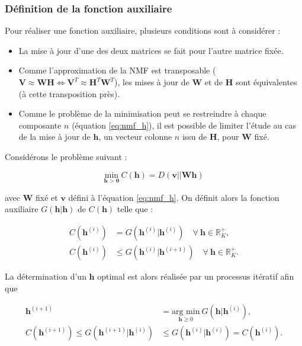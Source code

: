 \subsubsection{Définition de la fonction auxiliaire}\label{part:sub_fonction_aux}
Pour réaliser une fonction auxiliaire, plusieurs conditions sont à considérer :

\begin{itemize}
\item La mise à jour d'une des deux matrices se fait pour l'autre matrice fixée.
\item Comme l'approximation de la NMF est transposable ($\mathbf{V} \approx \mathbf{WH} \Leftrightarrow \mathbf{V}^T \approx \mathbf{H}^T \mathbf{W}^T$), les mises à jour de $\mathbf{W}$ et de $\mathbf{H}$ sont équivalentes (à cette transposition près).
\item Comme le problème de la minimisation peut se restreindre à chaque composante $n$ (équation \ref{eq:nmf_h}), il est possible de limiter l'étude au cas de la mise à jour de $\mathbf{h}$, un vecteur colonne $n$ issu de $ \mathbf{H}$, pour $\mathbf{W}$ fixé.
\end{itemize}

Considérons le problème suivant :

\begin{equation}\label{eq:costFunctionMM}
\underset{\textbf{h > 0}}{\text{min}}~C(\mathbf{h}) = D(\mathbf{v} \vert\vert \mathbf{Wh})
\end{equation}

avec $\mathbf{W}$ fixé et $\mathbf{v}$ défini à l'équation \ref{eq:nmf_h}. On définit alors la fonction auxiliaire $G(\mathbf{h}\vert \mathbf{h})$ de $C(\mathbf{h})$ telle que :

\begin{subequations}\label{eqs:conditionAux}
\begin{align}
C(\mathbf{h}^{\left(i\right)}) &= G(\mathbf{h}^{(i)}\vert \mathbf{h}^{(i)}) \quad \forall~\mathbf{h} \in \mathbb{R}^+_K,\\
C(\mathbf{h}^{(i)}) &\leq G(\mathbf{h}^{(i)} \vert \mathbf{h}^{(i+1)}) \quad \forall~\mathbf{h} \in \mathbb{R}^+_K.
\end{align}
\end{subequations}

La détermination d'un $\mathbf{h}$ optimal est alors réalisée par un processus itératif afin que

\begin{subequations}\label{eqs:conditionAux2}
\begin{align}
\textbf{h}^{(i+1)} &= \underset{\textbf{h} \geq 0}{\text{arg min}}~ G(\textbf{h}\vert \textbf{h}^{(i)}),\\
C(\mathbf{h}^{(i+1)}) \leq G(\textbf{h}^{(i+1)}\vert\mathbf{h}^{(i)}) &\leq G(\textbf{h}^{(i)}\vert\mathbf{h}^{(i)}) = C(\mathbf{h}^{(i)}).\label{eq:monotonie}
\end{align}
\end{subequations}

